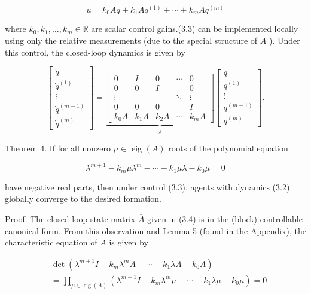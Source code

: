 \documentclass[10pt]{article}
\begin{document}
$$
u=k_{0} A q+k_{1} A q^{(1)}+\cdots+k_{m} A q^{(m)}
$$

where $k_{0}, k_{1}, \ldots, k_{m} \in \mathbb{R}$ are scalar control gains.(3.3) can be implemented locally using only the relative measurements (due to the special structure of $A$ ). Under this control, the closed-loop dynamics is given by

$$
\left[\begin{array}{c}
\grave{q} \\
\grave{q}^{(1)} \\
\vdots \\
\grave{q}^{(m-1)} \\
\grave{q}^{(m)}
\end{array}\right]=\underbrace{\left[\begin{array}{ccccc}
0 & I & 0 & \cdots & 0 \\
0 & 0 & I & & 0 \\
\vdots & & & \ddots & \vdots \\
0 & 0 & 0 & & I \\
k_{0} A & k_{1} A & k_{2} A & \cdots & k_{m} A
\end{array}\right]}_{\breve{A}}\left[\begin{array}{c}
q \\
q^{(1)} \\
\vdots \\
q^{(m-1)} \\
q^{(m)}
\end{array}\right] .
$$

Theorem 4. If for all nonzero $\mu \in$ eig $(A)$ roots of the polynomial equation

$$
\lambda^{m+1}-k_{m} \mu \lambda^{m}-\cdots-k_{1} \mu \lambda-k_{0} \mu=0
$$

have negative real parts, then under control (3.3), agents with dynamics (3.2) globally converge to the desired formation.

Proof. The closed-loop state matrix $\bar{A}$ given in (3.4) is in the (block) controllable canonical form. From this observation and Lemma 5 (found in the Appendix), the characteristic equation of $\bar{A}$ is given by

$$
\begin{aligned}
& \operatorname{det}\left(\lambda^{m+1} I-k_{m} \lambda^{m} A-\cdots-k_{1} \lambda A-k_{0} A\right) \\
& =\prod_{\mu \in \operatorname{eig}(A)}\left(\lambda^{m+1} I-k_{m} \lambda^{m} \mu-\cdots-k_{1} \lambda \mu-k_{0} \mu\right)=0
\end{aligned}
$$
\end{document}
